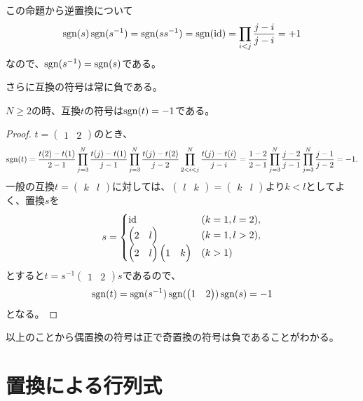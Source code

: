 \begin{remark}
この命題から逆置換について
$$
\operatorname{sgn}(s)\operatorname{sgn}(s^{-1}) = \operatorname{sgn}(s s^{-1}) = \operatorname{sgn}(\mathrm{id}) = \prod_{i < j}\frac{j-i}{j-i} = +1
$$
なので、$\operatorname{sgn}(s^{-1}) = \operatorname{sgn}(s)$である。
\end{remark}

さらに互換の符号は常に負である。

\begin{proposition}
$N \ge 2$の時、互換$t$の符号は$\operatorname{sgn}(t) = -1$である。
\end{proposition}

\begin{proof}
$t = \begin{pmatrix}1 & 2\end{pmatrix}$のとき、
$$
\operatorname{sgn}(t)
= \frac{t(2)-t(1)}{2-1}\prod_{j = 3}^N\frac{t(j)-t(1)}{j-1}\prod_{j = 3}^N\frac{t(j)-t(2)}{j-2}\prod_{2 < i < j}^N\frac{t(j)-t(i)}{j-i}
= \frac{1-2}{2-1}\prod_{j = 3}^N\frac{j-2}{j-1}\prod_{j = 3}^N\frac{j-1}{j-2}
= -1.
$$
一般の互換$t = \begin{pmatrix}k & l\end{pmatrix}$に対しては、$\begin{pmatrix}l & k\end{pmatrix} = \begin{pmatrix}k & l\end{pmatrix}$より$k < l$としてよく、置換$s$を
$$
s =
\begin{cases}
\mathrm{id} & (k = 1, l = 2), \\
\begin{pmatrix}2 & l\end{pmatrix} & (k = 1, l > 2), \\
\begin{pmatrix}2 & l\end{pmatrix}\begin{pmatrix}1 & k\end{pmatrix} & (k > 1) \\
\end{cases}
$$
とすると$t = s^{-1}\begin{pmatrix}1 & 2\end{pmatrix}s$であるので、
$$
\operatorname{sgn}(t) = \operatorname{sgn}(s^{-1})\operatorname{sgn}(\begin{pmatrix}1 & 2\end{pmatrix})\operatorname{sgn}(s) = -1
$$
となる。
\end{proof}

以上のことから偶置換の符号は正で奇置換の符号は負であることがわかる。

\section{置換による行列式}

